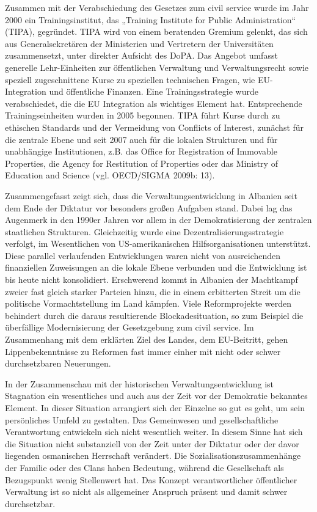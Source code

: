 Zusammen mit der Verabschiedung des Gesetzes zum civil service wurde im Jahr 2000 ein Trainingsinstitut, das „Training Institute for Public Administration“ (TIPA), gegründet. TIPA wird von einem beratenden Gremium gelenkt, das sich aus Generalsekretären der Ministerien und Vertretern der Universitäten zusammensetzt, unter direkter Aufsicht des DoPA. Das Angebot umfasst generelle Lehr-Einheiten zur öffentlichen Verwaltung und Verwaltungsrecht sowie speziell zugeschnittene Kurse zu speziellen technischen Fragen, wie EU-Integration und öffentliche Finanzen. Eine Trainingsstrategie wurde verabschiedet, die die EU Integration als wichtiges Element hat. Entsprechende Trainingseinheiten wurden in 2005 begonnen. TIPA führt Kurse durch zu ethischen Standards und der Vermeidung von Conflicts of Interest, zunächst für die zentrale Ebene und seit 2007 auch für die lokalen Strukturen und für unabhängige Institutionen, z.B. das Office for Registration of Immovable Properties, die Agency for Restitution of Properties oder das Ministry of Education and Science (vgl. OECD/SIGMA 2009b: 13).\par
Zusammengefasst zeigt sich, dass die Verwaltungsentwicklung in Albanien seit dem Ende der Diktatur vor besonders großen Aufgaben stand. Dabei lag das Augenmerk in den 1990er Jahren vor allem in der Demokratisierung der zentralen staatlichen Strukturen. Gleichzeitig wurde eine Dezentralisierungsstrategie verfolgt, im Wesentlichen von US-amerikanischen Hilfsorganisationen unterstützt. Diese parallel verlaufenden Entwicklungen waren nicht von ausreichenden finanziellen Zuweisungen an die lokale Ebene verbunden und die Entwicklung ist bis heute nicht konsolidiert. Erschwerend kommt in Albanien der Machtkampf zweier fast gleich starker Parteien hinzu, die in einem erbitterten Streit um die politische Vormachtstellung im Land kämpfen. Viele Reformprojekte werden behindert durch die daraus resultierende Blockadesituation, so zum Beispiel die überfällige Modernisierung der Gesetzgebung zum civil service. Im Zusammenhang mit dem erklärten Ziel des Landes, dem EU-Beitritt, gehen Lippenbekenntnisse zu Reformen fast immer einher mit nicht oder schwer durchsetzbaren Neuerungen.\par
In der Zusammenschau mit der historischen Verwaltungsentwicklung ist Stagnation ein wesentliches und auch aus der Zeit vor der Demokratie bekanntes Element. In dieser Situation arrangiert sich der Einzelne so gut es geht, um sein persönliches Umfeld zu gestalten. Das Gemeinwesen und gesellschaftliche Verantwortung entwickeln sich nicht wesentlich weiter. In diesem Sinne hat sich die Situation nicht substanziell von der Zeit unter der Diktatur oder der davor liegenden osmanischen Herrschaft verändert. Die Sozialisationszusammenhänge der Familie oder des Clans haben Bedeutung, während die Gesellschaft als Bezugspunkt wenig Stellenwert hat. Das Konzept verantwortlicher öffentlicher Verwaltung ist so nicht als allgemeiner Anspruch präsent und damit schwer durchsetzbar.
